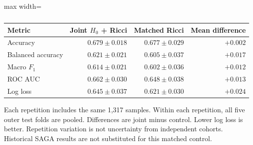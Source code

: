 \begin{table}[!htbp]
\centering\small
\caption{}
\label{tab:joint-v8-sample}
\begingroup\bfseries\boldmath
\begin{adjustbox}{max width=\linewidth}
\begin{tabular}{lrrr}
\toprule
Metric & Joint $H_0$ + Ricci & Matched Ricci & Mean difference \\
\midrule
Accuracy & $0.679 \pm 0.018$ & $0.677 \pm 0.029$ & $+0.002$ \\
Balanced accuracy & $0.621 \pm 0.021$ & $0.605 \pm 0.037$ & $+0.017$ \\
Macro $F_1$ & $0.614 \pm 0.021$ & $0.602 \pm 0.036$ & $+0.012$ \\
ROC AUC & $0.662 \pm 0.030$ & $0.648 \pm 0.038$ & $+0.013$ \\
Log loss & $0.645 \pm 0.037$ & $0.621 \pm 0.030$ & $+0.024$ \\
\bottomrule
\end{tabular}
\end{adjustbox}
\par\smallskip\begin{minipage}{0.98\linewidth}\footnotesize Each repetition includes the same 1,317 samples. Within each repetition, all five outer test folds are pooled. Differences are joint minus control. Lower log loss is better. Repetition variation is not uncertainty from independent cohorts. Historical SAGA results are not substituted for this matched control.
\end{minipage}
\endgroup
\end{table}
